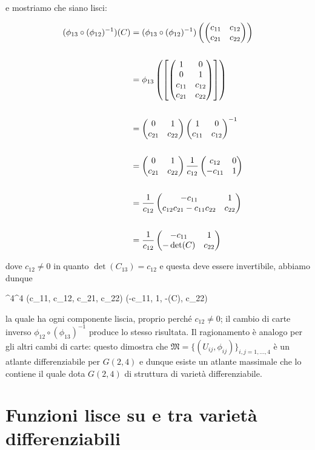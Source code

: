 e mostriamo che siano lisci:

\begin{align}
	\begin{split}
		(\phi_{13} \circ (\phi_{12})^{-1}) (C) &= (\phi_{13} \circ (\phi_{12})^{-1}) \left( \pmqty{ c_{11} & c_{12} \\ c_{21} & c_{22} } \right)\\\\
		&= \phi_{13} \left( \left[ \pmqty{ 1 & 0 \\ 0 & 1 \\ c_{11} & c_{12} \\ c_{21} & c_{22} } \right] \right)\\\\
		&= \pmqty{ 0 & 1 \\ c_{21} & c_{22} } \pmqty{ 1 & 0 \\ c_{11} & c_{12} }^{-1}\\\\
		&= \pmqty{ 0 & 1 \\ c_{21} & c_{22} } \dfrac{1}{c_{12}} \pmqty{ c_{12} & 0 \\ -c_{11} & 1 }\\\\
		&= \dfrac{1}{c_{12}} \pmqty{ -c_{11} & 1 \\ c_{12} c_{21} - c_{11} c_{22} & c_{22} }\\\\
		&= \dfrac{1}{c_{12}} \pmqty{ -c_{11} & 1 \\ -\det(C) & c_{22} }
	\end{split}
\end{align}

dove $ c_{12} \neq 0 $ in quanto $ \det(C_{13}) = c_{12} $ e questa deve essere invertibile, abbiamo dunque

	{\R^{4}}{\R^{4}}
	{(c_{11}, c_{12}, c_{21}, c_{22})}{ (-c_{11}, 1, -\det(C), c_{22})}

la quale ha ogni componente liscia, proprio perché $ c_{12} \neq 0 $; il cambio di carte inverso $ \phi_{12} \circ (\phi_{13})^{-1} $ produce lo stesso risultata. Il ragionamento è analogo per gli altri cambi di carte: questo dimostra che $ \mathfrak{M} = \{(U_{ij},\phi_{ij})\}_{i,j=1,\dots,4} $ è un atlante differenziabile per $ G(2,4) $ e dunque esiste un atlante massimale che lo contiene il quale dota $ G(2,4) $ di struttura di varietà differenziabile.

\section{Funzioni lisce su e tra varietà differenziabili}

